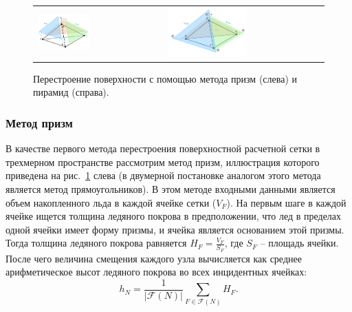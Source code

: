 \begin{figure}[h]
\centering
\begin{tabular}{ll}
\includegraphics[width=0.43\textwidth]{fig/3dr_prisms.pdf}
&
\includegraphics[width=0.52\textwidth]{fig/3dr_pyramids.pdf}
\end{tabular}
\singlespacing
{}\caption{Перестроение поверхности с помощью метода призм (слева) и пирамид (справа).}
\label{fig:text_1_remesh3_rect}
\end{figure}

\subsubsection{Метод призм}

В качестве первого метода перестроения поверхностной расчетной сетки в трехмерном пространстве рассмотрим метод призм, иллюстрация которого приведена на рис.~\ref{fig:text_1_remesh3_rect} слева (в двумерной постановке аналогом этого метода является метод прямоугольников).
В этом методе входными данными является объем накопленного льда в каждой ячейке сетки ($V_F$).
На первым шаге в каждой ячейке ищется толщина ледяного покрова в предположении, что лед в пределах одной ячейки имеет форму призмы, и ячейка является основанием этой призмы.
Тогда толщина ледяного покрова равняется $H_F = \frac{V_F}{S_F}$, где $S_F$ -- площадь ячейки.
После чего величина смещения каждого узла вычисляется как среднее арифметическое высот ледяного покрова во всех инцидентных ячейках:
\begin{equation}
h_N = \frac{1}{|\mathscr{F}(N)|} \sum_{F \in \mathscr{F}(N)}{H_F}.
\end{equation}

